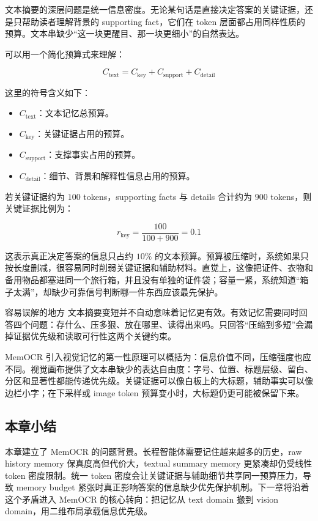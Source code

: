 文本摘要的深层问题是统一信息密度。无论某句话是直接决定答案的关键证据，还是只帮助读者理解背景的 supporting fact，它们在 token 层面都占用同样性质的预算。文本串缺少“这一块更醒目、那一块更细小”的自然表达。

可以用一个简化预算式来理解：

$$
C_{\text{text}} = C_{\text{key}} + C_{\text{support}} + C_{\text{detail}}
$$

这里的符号含义如下：

\begin{itemize}
  \item $C_{\text{text}}$：文本记忆总预算。
  \item $C_{\text{key}}$：关键证据占用的预算。
  \item $C_{\text{support}}$：支撑事实占用的预算。
  \item $C_{\text{detail}}$：细节、背景和解释性信息占用的预算。
\end{itemize}

若关键证据约为 \(100\) tokens，supporting facts 与 details 合计约为 \(900\) tokens，则关键证据比例为：

$$
r_{\text{key}} = \frac{100}{100 + 900} = 0.1
$$

这表示真正决定答案的信息只占约 \(10\%\) 的文本预算。预算被压缩时，系统如果只按长度删减，很容易同时削弱关键证据和辅助材料。直觉上，这像把证件、衣物和备用物品都塞进同一个旅行箱，并且没有单独的证件袋；容量一紧，系统知道“箱子太满”，却缺少可靠信号判断哪一件东西应该最先保护。

\begin{warningbox}{容易误解的地方}
文本摘要变短并不自动意味着记忆更有效。有效记忆需要同时回答四个问题：存什么、压多狠、放在哪里、读得出来吗。只回答“压缩到多短”会漏掉证据优先级和读取可行性这两个关键约束。
\end{warningbox}

MemOCR 引入视觉记忆的第一性原理可以概括为：信息价值不同，压缩强度也应不同。视觉画布提供了文本串缺少的表达自由度：字号、位置、标题层级、留白、分区和显著性都能传递优先级。关键证据可以像白板上的大标题，辅助事实可以像边栏小字；在下采样或 image token 预算变小时，大标题仍更可能被保留下来。

\subsection{本章小结}

本章建立了 MemOCR 的问题背景。长程智能体需要记住越来越多的历史，raw history memory 保真度高但代价大，textual summary memory 更紧凑却仍受线性 token 密度限制。统一 token 密度会让关键证据与辅助细节共享同一预算压力，导致 memory budget 紧张时真正影响答案的信息缺少优先保护机制。下一章将沿着这个矛盾进入 MemOCR 的核心转向：把记忆从 text domain 搬到 vision domain，用二维布局承载信息优先级。
